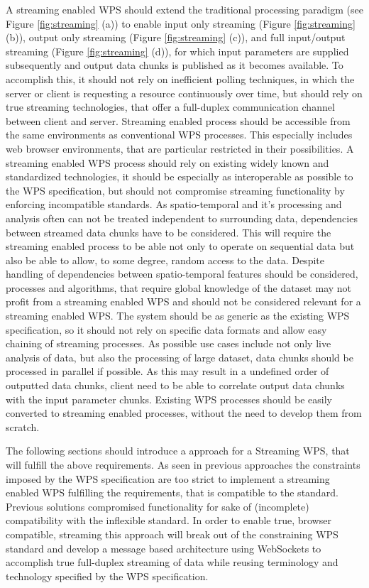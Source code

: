 	A streaming enabled \ac{WPS} should extend the traditional processing paradigm (see Figure \ref{fig:streaming} (a)) to enable input only streaming (Figure \ref{fig:streaming} (b)), output only streaming (Figure \ref{fig:streaming} (c)), and full input/output streaming (Figure \ref{fig:streaming} (d)), for which input parameters are supplied subsequently and output data chunks is published as it becomes available. To accomplish this, it should not rely on inefficient polling techniques, in which the server or client is requesting a resource continuously over time, but should rely on true streaming technologies, that offer a full-duplex communication channel between client and server. Streaming enabled process should be accessible from the same environments as conventional \ac{WPS} processes. This especially includes web browser environments, that are particular restricted in their possibilities. A streaming enabled \ac{WPS} process should rely on existing widely known and standardized technologies, it should be especially as interoperable as possible to the \ac{WPS} specification, but should not compromise streaming functionality by enforcing incompatible standards. As spatio-temporal and it's processing and analysis often can not be treated independent to surrounding data, dependencies between streamed data chunks have to be considered. This will require the streaming enabled process to be able not only to operate on sequential data but also be able to allow, to some degree, random access to the data. Despite handling of dependencies between spatio-temporal features should be considered, processes and algorithms, that require global knowledge of the dataset may not profit from a streaming enabled WPS and should not be considered relevant for a streaming enabled \ac{WPS}. The system should be as generic as the existing \ac{WPS} specification, so it should not rely on specific data formats and allow easy chaining of streaming processes. As possible use cases include not only live analysis of data, but also the processing of large dataset, data chunks should be processed in parallel if possible. As this may result in a undefined order of outputted data chunks, client need to be able to correlate output data chunks with the input parameter chunks. Existing \ac{WPS} processes should be easily converted to streaming enabled processes, without the need to develop them from scratch.

	The following sections should introduce a approach for a Streaming \ac{WPS}, that will fulfill the above requirements. As seen in previous approaches the constraints imposed by the \ac{WPS} specification are too strict to implement a streaming enabled WPS fulfilling the requirements, that is compatible to the standard. Previous solutions compromised functionality for sake of (incomplete) compatibility with the inflexible standard. In order to enable true, browser compatible, streaming this approach will break out of the constraining \ac{WPS} standard and develop a message based architecture using WebSockets to accomplish true full-duplex streaming of data while reusing terminology and technology specified by the \ac{WPS} specification.

